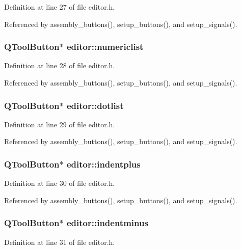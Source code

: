 Definition at line 27 of file editor.h.

Referenced by assembly\_\-buttons(), setup\_\-buttons(), and setup\_\-signals().
\subsubsection{\setlength{\rightskip}{0pt plus 5cm}QTool\-Button$\ast$ {\bf editor::numericlist}}\label{classeditor_0e36743d04041b7ee6143b9fae871be0}




Definition at line 28 of file editor.h.

Referenced by assembly\_\-buttons(), setup\_\-buttons(), and setup\_\-signals().
\subsubsection{\setlength{\rightskip}{0pt plus 5cm}QTool\-Button$\ast$ {\bf editor::dotlist}}\label{classeditor_85198ec3010adef3456a436469c4fe68}




Definition at line 29 of file editor.h.

Referenced by assembly\_\-buttons(), setup\_\-buttons(), and setup\_\-signals().
\subsubsection{\setlength{\rightskip}{0pt plus 5cm}QTool\-Button$\ast$ {\bf editor::indentplus}}\label{classeditor_c29b42abeb9d03b1b301fce862455d43}




Definition at line 30 of file editor.h.

Referenced by assembly\_\-buttons(), setup\_\-buttons(), and setup\_\-signals().
\subsubsection{\setlength{\rightskip}{0pt plus 5cm}QTool\-Button$\ast$ {\bf editor::indentminus}}\label{classeditor_4c1e7061b3b7c9b164a5d0274a7bf213}




Definition at line 31 of file editor.h.

